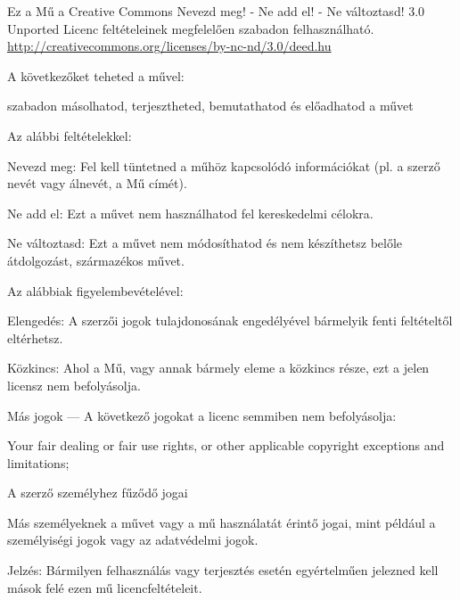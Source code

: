 
{\small\setlength{\parindent}{0pt}%
\raggedright\label{copyright-details}
{\centering

{\large\ccbyncnd}
\bigskip

Ez a Mű a Creative Commons Nevezd meg! - Ne add el! - Ne változtasd! 3.0 Unported Licenc feltételeinek megfelelően szabadon felhasználható.\\
\href{http://creativecommons.org/licenses/by-nc-nd/3.0/deed.hu}{http://creativecommons.org/licenses/by-nc-nd/3.0/deed.hu}\\

}
\bigskip

A következőket teheted a művel:

\begin{packeditemize}
\item szabadon másolhatod, terjesztheted, bemutathatod és előadhatod a művet
\end{packeditemize}

Az alábbi feltételekkel:

\begin{packeditemize}
\item Nevezd meg: Fel kell tüntetned a műhöz kapcsolódó információkat (pl. a szerző nevét vagy álnevét, a Mű címét).
\item Ne add el: Ezt a művet nem használhatod fel kereskedelmi célokra.
\item Ne változtasd: Ezt a művet nem módosíthatod és nem készíthetsz belőle átdolgozást, származékos művet.
\end{packeditemize}

Az alábbiak figyelembevételével:

\begin{packeditemize}
\item Elengedés: A szerzői jogok tulajdonosának engedélyével bármelyik fenti feltételtől eltérhetsz.
\item Közkincs: Ahol a Mű, vagy annak bármely eleme a közkincs része, ezt a jelen licensz nem befolyásolja.
\item Más jogok — A következő jogokat a licenc semmiben nem befolyásolja:
\begin{packeditemize}
\item Your fair dealing or fair use rights, or other applicable copyright exceptions and limitations;
\item A szerző személyhez fűződő jogai
\item Más személyeknek a művet vagy a mű használatát érintő jogai, mint például a személyiségi jogok vagy az adatvédelmi jogok.
\end{packeditemize}
\item Jelzés: Bármilyen felhasználás vagy terjesztés esetén egyértelműen jelezned kell mások felé ezen mű licencfeltételeit.
\end{packeditemize}

}
